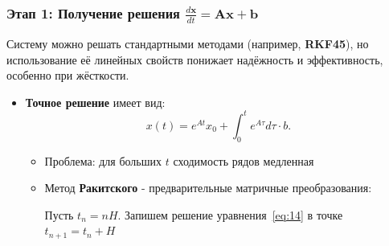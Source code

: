 	\subsubsection{Этап 1: Получение решения $\frac{d \mathbf{x}}{d t} = \mathbf{A} \mathbf{x} + \mathbf{b}$}
	Систему можно решать стандартными методами (например, \textbf{RKF45}), но использование её линейных свойств понижает надёжность и эффективность, особенно при жёсткости.
	\begin{itemize}[leftmargin=1em]
		\item \textbf{Точное решение} имеет вид:
		\begin{equation}
			x(t) = e^{A t} x_0 + \int_0^t e^{A \tau} d \tau \cdot b.
			\label{eq:14}
		\end{equation}
		\begin{itemize}
			\item Проблема: для больших \(t\) сходимость рядов медленная
			\item Метод \textbf{Ракитского} - предварительные матричные преобразования: 
			\par
			Пусть \( t_n = nH \). Запишем решение уравнения~\eqref{eq:14} в точке \( t_{n+1} = t_n + H \)
			

\end{itemize}
\end{itemize}
